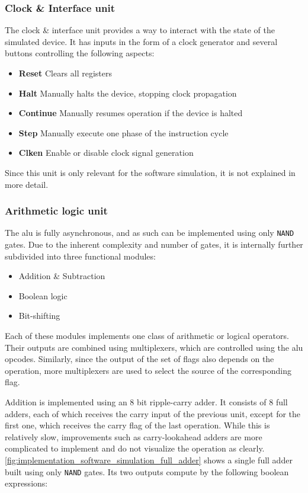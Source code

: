 \subsubsection{Clock \& Interface unit}

The clock \& interface unit provides a way to interact with the state of the simulated device. It has inputs in the form of a clock generator and several buttons controlling the following aspects:

\begin{itemize}
    \item \textbf{Reset} Clears all registers
    \item \textbf{Halt} Manually halts the device, stopping clock propagation
    \item \textbf{Continue} Manually resumes operation if the device is halted
    \item \textbf{Step} Manually execute one phase of the instruction cycle
    \item \textbf{Clken} Enable or disable clock signal generation     
\end{itemize}

Since this unit is only relevant for the software simulation, it is not explained in more detail.

\subsubsection{Arithmetic logic unit}

The \ac{alu} is fully asynchronous, and as such can be implemented using only \texttt{NAND} gates. Due to the inherent complexity and number of gates, it is internally further subdivided into three functional modules:

\begin{itemize}
    \item Addition \& Subtraction
    \item Boolean logic
    \item Bit-shifting
\end{itemize}

Each of these modules implements one class of arithmetic or logical operators. Their outputs are combined using multiplexers, which are controlled using the \ac{alu} opcodes. Similarly, since the output of the set of flags also depends on the operation, more multiplexers are used to select the source of the corresponding flag.

Addition is implemented using an 8 bit ripple-carry adder. It consists of 8 full adders, each of which receives the carry input of the previous unit, except for the first one, which receives the carry flag of the last operation. While this is relatively slow, improvements such as carry-lookahead adders are more complicated to implement and do not visualize the operation as clearly. \autoref{fig:implementation_software_simulation_full_adder} shows a single full adder built using only \texttt{NAND} gates. Its two outputs compute by the following boolean expressions:

